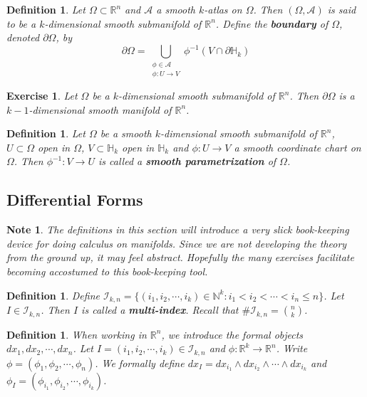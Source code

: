 \documentclass[12pt]{amsart}
\newtheorem{defn}[thm]{Definition}
\newtheorem{note}[thm]{Note}
\newtheorem{ex}[thm]{Exercise}
\newcommand{\Om}{\Omega}
\newcommand{\N}{\mathbb{N}}
\renewcommand{\H}{\mathbb{H}}
\newcommand{\R}{\mathbb{R}}
\newcommand{\MA}{\mathcal{A}}
\newcommand{\MI}{\mathcal{I}}
\begin{document}
	\begin{defn}
		Let $\Om \subset \R^n$ and $\MA$ a smooth $k$-atlas on $\Om$. Then $(\Om, \MA)$ is said to be a $k$-dimensional smooth submanifold of $\R^n$. Define the \textbf{boundary} of $\Om$, denoted $\partial \Om$, by $$\partial \Om = \bigcup_{\substack{\phi \in \MA \\ \phi:U \rightarrow V}} \phi^{-1}(V \cap \partial \H_k) $$
	\end{defn}
	
	\begin{ex}
		Let $\Om$ be a $k$-dimensional smooth submanifold of $\R^n$. Then $\partial \Om$ is a $k-1$-dimensional smooth manifold of $\R^n$.
	\end{ex}
	
	\begin{defn}
		Let $\Om$ be a smooth $k$-dimensional smooth submanifold of $\R^n$, $U \subset \Om$ open in $\Om$, $V \subset \H_k$ open in $\H_k$ and $\phi: U \rightarrow V$ a smooth coordinate chart on $\Om$. Then $\phi^{-1}: V \rightarrow U$ is called a \textbf{smooth parametrization} of $\Om$. 
	\end{defn}
	
	\subsection{Differential Forms}
	
	\begin{note}
		The definitions in this section will introduce a very slick book-keeping device for doing calculus on manifolds. Since we are not developing the theory from the ground up, it may feel abstract. Hopefully the many exercises facilitate becoming accostumed to this book-keeping tool.
	\end{note}
	
	\begin{defn}
		Define $\MI_{k, n} = \{(i_1, i_2, \cdots, i_k) \in \N^k: i_1 < i_2 < \cdots < i_n \leq n \}$. Let $I \in \MI_{k,n}$. Then $I$ is called a \textbf{multi-index}. Recall that $\# \MI_{k,n} = {n \choose k}$.
	\end{defn}
	
	\begin{defn}
		When working in $\R^n$, we introduce the formal objects $dx_1, dx_2, \cdots, dx_n$. Let $I = (i_1, i_2, \cdots, i_k)\in \MI_{k,n}$ and $\phi: \R^k \rightarrow \R^n$. Write $\phi = (\phi_1, \phi_2, \cdots, \phi_n)$. We formally define $dx_I = dx_{i_1}\wedge dx_{i_2} \wedge \cdots \wedge dx_{i_k}$ and $\phi_I = (\phi_{i_1}, \phi_{i_2}, \cdots, \phi_{i_k})$.   
	\end{defn}
	
\end{document}

